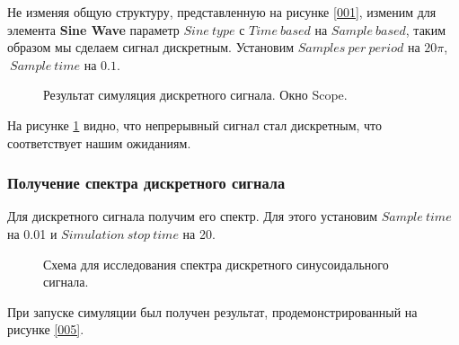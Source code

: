 \documentclass[a4paper,14pt]{extarticle}
\begin{document}
Не изменяя общую структуру, представленную на рисунке \ref{001}, изменим для элемента \textbf{Sine Wave} параметр $Sine \ type$ с $Time \ based$ на $Sample \ based$, таким образом мы сделаем сигнал дискретным. Установим $Samples \ per \ period$ на $20\pi$, $\ Sample \ time$ на $0.1$.

\begin{figure}[H]
\caption{Результат симуляция дискретного сигнала. Окно Scope.}
\label{003}
\end{figure}

На рисунке \ref{003} видно, что непрерывный сигнал стал дискретным, что соответствует нашим ожиданиям.

\subsubsection{Получение спектра дискретного сигнала}

Для дискретного сигнала получим его спектр. Для этого установим $Sample \ time$ на 0.01 и $Simulation \ stop \ time$ на 20.

\begin{figure}[H]
\caption{Схема для исследования спектра дискретного синусоидального сигнала.}
\label{004}
\end{figure}

При запуске симуляции был получен результат, продемонстрированный на рисунке \ref{005}.
\end{document}
